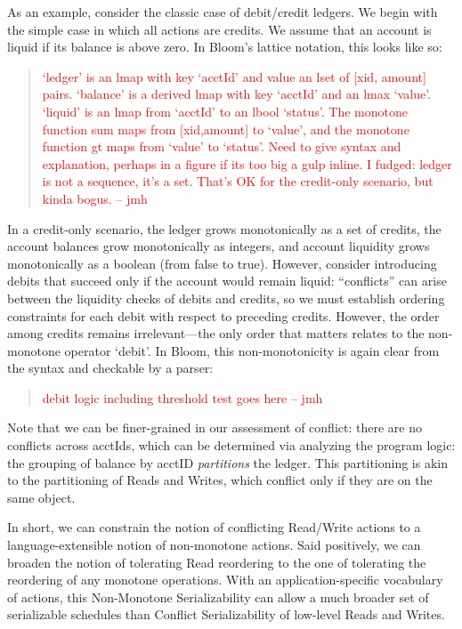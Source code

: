 \documentclass{sig-alternate}
\newcommand{\jmh}[1]{{\textcolor{red}{#1 -- jmh}}}
\begin{document}
As an example, consider the classic case of debit/credit ledgers.  We begin with the simple case in which all actions are credits. We assume that an account is liquid if its balance is above zero. In Bloom's lattice notation, this looks like so:
\begin{quote}
	\jmh{`ledger' is an lmap with key `acctId' and value an lset of [xid, amount] pairs.  `balance' is a derived lmap with key `acctId' and an lmax `value'.  `liquid' is an lmap from `acctId' to an lbool `status'.  The monotone function sum maps from [xid,amount] to `value', and the monotone function gt maps from `value' to `status'. Need to give syntax and explanation, perhaps in a figure if its too big a gulp inline.  I fudged:  ledger is not a sequence, it's a set.  That's OK for the credit-only scenario, but kinda bogus.}
\end{quote}
In a credit-only scenario, the ledger grows monotonically as a set of credits, the account balances grow monotonically as integers, and account liquidity grows monotonically as a boolean (from false to true).  However, consider introducing debits that succeed only if the account would remain liquid: ``conflicts'' can arise between the liquidity checks of debits and credits, so we must establish ordering constraints for each debit with respect to preceding credits.  However, the order among credits remains irrelevant---the only order that matters relates to the non-monotone operator `debit'.  In Bloom, this non-monotonicity is again clear from the syntax and checkable by a parser:
\begin{quote}
	\jmh{debit logic including threshold test goes here}
\end{quote}
Note that we can be finer-grained in our assessment of conflict: there are no conflicts across acctIds, which can be determined via analyzing the program logic: the grouping of balance by acctID \emph{partitions} the ledger.  This partitioning is akin to the partitioning of Reads and Writes, which conflict only if they are on the same object.

In short, we can constrain the notion of conflicting Read/Write actions to a language-extensible notion of non-monotone actions.  Said positively, we can broaden the notion of tolerating Read reordering to the one of tolerating the reordering of any monotone operations.  With an application-specific vocabulary of actions, this Non-Monotone Serializability can allow a much broader set of serializable schedules than Conflict Serializability of low-level Reads and Writes.
\end{document}
